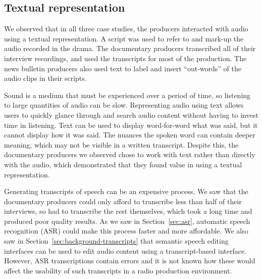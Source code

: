 
\subsection{Textual representation}
We observed that in all three case studies, the producers interacted with audio using a textual representation. A
script was used to refer to and mark-up the audio recorded in the drama. The documentary producers transcribed all of
their interview recordings, and used the transcripts for most of the production. The news bulletin producers also used
text to label and insert ``out-words'' of the audio clips in their scripts.

Sound is a medium that must be experienced over a period of time, so listening to large quantities of audio can be
slow. Representing audio using text allows users to quickly glance through and search audio content without having to
invest time in listening. Text can be used to display word-for-word what was said, but it cannot display how it was
said. The nuances the spoken word can contain deeper meaning, which may not be visible in a written
transcript. Despite this, the documentary producers we observed chose to work with text rather than directly with the
audio, which demonstrated that they found value in using a textual representation.

Generating transcripts of speech can be an expensive process. We saw that the documentary producers could only afford
to transcribe less than half of their interviews, so had to transcribe the rest themselves, which took a long time and
produced poor quality results.  As we saw in Section~\ref{sec:asr}, automatic speech recognition (ASR) could make this
process faster and more affordable. We also saw in Section~\ref{sec:background-transcripts} that semantic speech
editing interfaces can be used to edit audio content using a transcript-based interface. However, ASR transcriptions
contain errors and it is not known how these would affect the usability of such transcripts in a radio production
environment.

